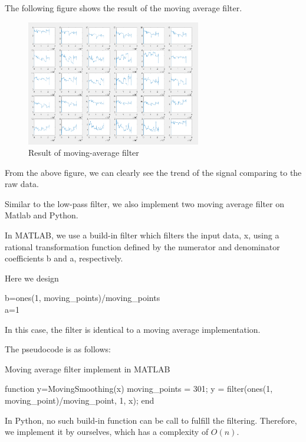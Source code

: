 \documentclass[conference]{IEEEtran}
\begin{document}
The following figure shows the result of the moving average filter.
\begin{figure}[H]
\centering
\includegraphics[width=3in]{MAF.png}
\caption{Result of moving-average filter}
\end{figure}
From the above figure, we can clearly see the trend of the signal comparing to the raw data.

Similar to the low-pass filter, we also implement two moving average filter on Matlab and Python.

In MATLAB, we use a build-in filter which filters the input data, x, using a rational transformation function defined by the numerator and denominator coefficients b and a, respectively.

Here we design
\begin{algorithm}[H]
b=ones(1, moving\_points)/moving\_points\\
a=1
\end{algorithm}
In this case, the filter is identical to a moving average implementation.

The pseudocode is as follows:
\begin{algorithm}
\centering
	\caption{Moving average filter implement in MATLAB}
	\begin{algorithmic}
	\STATE function y=MovingSmoothing(x) 
	\STATE \qquad moving\_points = 301;
	\STATE \qquad y = filter(ones(1, moving\_point)/moving\_point, 1, x);
	\STATE end
	\end{algorithmic}
\end{algorithm}

In Python, no such build-in function can be call to fulfill the filtering. Therefore, we implement it by ourselves, which has a complexity of $O(n)$.
\end{document}

